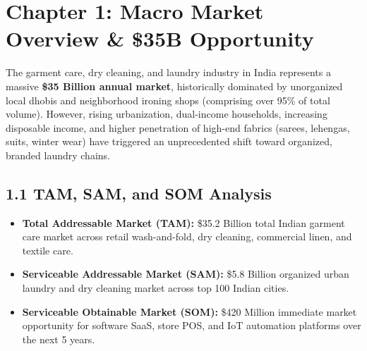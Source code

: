 \documentclass[11pt,a4paper]{article}
\begin{document}
\clearpage

\section{Chapter 1: Macro Market Overview \& \$35B Opportunity}

The garment care, dry cleaning, and laundry industry in India represents a massive \textbf{\$35 Billion annual market}, historically dominated by unorganized local dhobis and neighborhood ironing shops (comprising over 95\% of total volume). However, rising urbanization, dual-income households, increasing disposable income, and higher penetration of high-end fabrics (sarees, lehengas, suits, winter wear) have triggered an unprecedented shift toward organized, branded laundry chains.

\subsection{1.1 TAM, SAM, and SOM Analysis}
\begin{itemize}
    \item \textbf{Total Addressable Market (TAM):} \$35.2 Billion total Indian garment care market across retail wash-and-fold, dry cleaning, commercial linen, and textile care.
    \item \textbf{Serviceable Addressable Market (SAM):} \$5.8 Billion organized urban laundry and dry cleaning market across top 100 Indian cities.
    \item \textbf{Serviceable Obtainable Market (SOM):} \$420 Million immediate market opportunity for software SaaS, store POS, and IoT automation platforms over the next 5 years.
\end{itemize}
\end{document}
